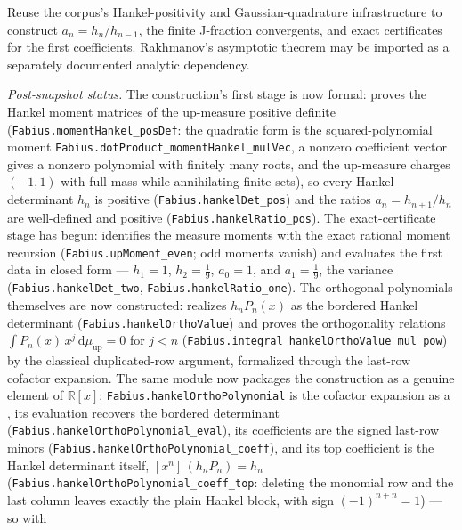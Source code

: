 \documentclass[11pt,oneside]{article}
\theoremstyle{definition}
\theoremstyle{remark}
\newcommand{\Up}{\operatorname{up}}
\newcommand{\R}{\mathbb R}
\newcommand{\dd}{\,\mathrm d}
\newcommand{\1}{\mathbf 1}
\begin{document}
\begin{obligation}
Reuse the corpus's Hankel-positivity and Gaussian-quadrature infrastructure to
construct \(a_n=h_n/h_{n-1}\), the finite J-fraction convergents, and exact
certificates for the first coefficients.  Rakhmanov's asymptotic theorem may be
imported as a separately documented analytic dependency.
\end{obligation}

\emph{Post-snapshot status.}  The construction's first stage is now formal:
 proves the Hankel moment matrices of the up-measure
positive definite (\nolinkurl{Fabius.momentHankel\_posDef}: the quadratic form is the
squared-polynomial moment \nolinkurl{Fabius.dotProduct\_momentHankel\_mulVec}, a
nonzero coefficient vector gives a nonzero polynomial with finitely many roots, and
the up-measure charges $(-1,1)$ with full mass while annihilating finite sets), so
every Hankel determinant $h_n$ is positive (\nolinkurl{Fabius.hankelDet\_pos}) and the
ratios $a_n=h_{n+1}/h_n$ are well-defined and positive
(\nolinkurl{Fabius.hankelRatio\_pos}).  The exact-certificate stage has begun:
 identifies the measure moments with the exact rational
moment recursion (\nolinkurl{Fabius.upMoment\_even}; odd moments vanish) and evaluates the
first data in closed form --- $h_1=1$, $h_2=\tfrac19$, $a_0=1$, and $a_1=\tfrac19$, the
variance (\nolinkurl{Fabius.hankelDet\_two}, \nolinkurl{Fabius.hankelRatio\_one}).  The orthogonal
polynomials themselves are now constructed:
 realizes $h_nP_n(x)$ as the bordered
Hankel determinant (\nolinkurl{Fabius.hankelOrthoValue}) and proves the orthogonality
relations $\int P_n(x)\,x^{j}\dd\mu_{\Up}=0$ for $j<n$
(\nolinkurl{Fabius.integral\_hankelOrthoValue\_mul\_pow}) by the classical duplicated-row
argument, formalized through the last-row cofactor expansion.  The same module now
packages the construction as a genuine element of $\R[x]$:
\nolinkurl{Fabius.hankelOrthoPolynomial} is the cofactor expansion as a ,
its evaluation recovers the bordered determinant
(\nolinkurl{Fabius.hankelOrthoPolynomial\_eval}), its coefficients are the signed last-row
minors (\nolinkurl{Fabius.hankelOrthoPolynomial\_coeff}), and its top coefficient is the
Hankel determinant itself, $[x^n]\,(h_nP_n)=h_n$
(\nolinkurl{Fabius.hankelOrthoPolynomial\_coeff\_top}: deleting the monomial row and the
last column leaves exactly the plain Hankel block, with sign $(-1)^{n+n}=1$) --- so with
\end{document}

